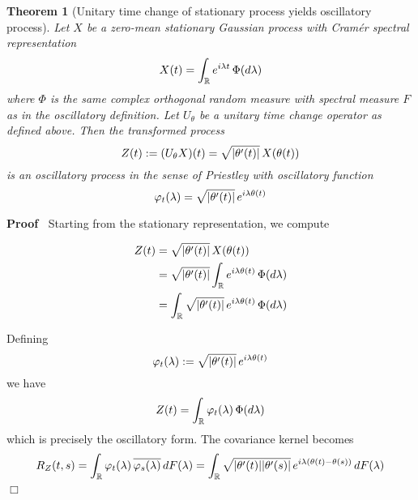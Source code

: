 \documentclass{article}
\newcommand{\assign}{:=}
\newenvironment{proof}{\noindent\textbf{Proof\ }}{\hspace*{\fill}$\Box$\medskip}
\newtheorem{theorem}{Theorem}
\begin{document}
\begin{theorem}
  [Unitary time change of stationary process yields oscillatory process] Let
  $X$ be a zero-mean stationary Gaussian process with Cram{\'e}r spectral
  representation
  \begin{equation}
    X (t) = \int_{\mathbb{R}} e^{i \lambda t}  \hspace{0.17em} \Phi (d
    \lambda)
  \end{equation}
  where $\Phi$ is the same complex orthogonal random measure with spectral
  measure $F$ as in the oscillatory definition. Let $U_{\theta}$ be a unitary
  time change operator as defined above. Then the transformed process
  \begin{equation}
    Z (t) \assign (U_{\theta} X) (t) = \sqrt{| \theta' (t) |}  \hspace{0.17em}
    X (\theta (t))
  \end{equation}
  is an oscillatory process in the sense of Priestley with oscillatory
  function
  \begin{equation}
    \varphi_t (\lambda) = \sqrt{| \theta' (t) |}  \hspace{0.17em} e^{i \lambda
    \theta (t)}
  \end{equation}
\end{theorem}

\begin{proof}
  Starting from the stationary representation, we compute
  
  \begin{align}
    Z (t) & = \sqrt{| \theta' (t) |}  \hspace{0.17em} X (\theta (t)) \\
    & = \sqrt{| \theta' (t) |}  \int_{\mathbb{R}} e^{i \lambda \theta (t)} 
    \hspace{0.17em} \Phi (d \lambda) \\
    & = \int_{\mathbb{R}} \sqrt{| \theta' (t) |}  \hspace{0.17em} e^{i
    \lambda \theta (t)}  \hspace{0.17em} \Phi (d \lambda) 
  \end{align}
  
  Defining
  \begin{equation}
    \varphi_t (\lambda) \assign \sqrt{| \theta' (t) |}  \hspace{0.17em} e^{i
    \lambda \theta (t)}
  \end{equation}
  we have
  \[ Z (t) = \int_{\mathbb{R}} \varphi_t (\lambda)  \hspace{0.17em} \Phi (d
     \lambda) \]
  which is precisely the oscillatory form. The covariance kernel becomes
  \[ R_Z (t, s) = \int_{\mathbb{R}} \varphi_t (\lambda) \hspace{0.17em}
     \overline{\varphi_s (\lambda)} \hspace{0.17em} dF (\lambda) =
     \int_{\mathbb{R}} \sqrt{| \theta' (t) || \theta' (s) |}  \hspace{0.17em}
     e^{i \lambda (\theta (t) - \theta (s))}  \hspace{0.17em} dF (\lambda) \]
\end{proof}
\end{document}

